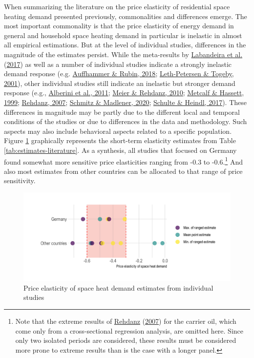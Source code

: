 \documentclass[12pt,twoside]{reedthesis}
\begin{document}
When summarizing the literature on the price elasticity of residential space heating demand presented previously, commonalities and differences emerge. The most important commonality is that the price elasticity of energy demand in general and household space heating demand in particular is inelastic in almost all empirical estimations. But at the level of individual studies, differences in the magnitude of the estimates persist. While the meta-results by \protect\hyperlink{ref-labandeira_etal17}{Labandeira et al.} (\protect\hyperlink{ref-labandeira_etal17}{2017}) as well as a number of individual studies indicate a strongly inelastic demand response (e.g. \protect\hyperlink{ref-auffhammer_rubin18}{Auffhammer \& Rubin, 2018}; \protect\hyperlink{ref-leth-petersen_togeby01}{Leth-Petersen \& Togeby, 2001}), other individual studies still indicate an inelastic but stronger demand response (e.g., \protect\hyperlink{ref-alberini_etal11}{Alberini et al., 2011}; \protect\hyperlink{ref-meier_rehdanz10}{Meier \& Rehdanz, 2010}; \protect\hyperlink{ref-metcalf_hassett99}{Metcalf \& Hassett, 1999}; \protect\hyperlink{ref-rehdanz07}{Rehdanz, 2007}; \protect\hyperlink{ref-schmitz_madlener20}{Schmitz \& Madlener, 2020}; \protect\hyperlink{ref-schulte_heindl17}{Schulte \& Heindl, 2017}). These differences in magnitude may be partly due to the different local and temporal conditions of the studies or due to differences in the data and methodology. Such aspects may also include behavioral aspects related to a specific population. Figure \ref{fig:literature-estimates-plot} graphically represents the short-term elasticity estimates from Table \ref{tab:estimates-literature}. As a synthesis, all studies that focused on Germany found somewhat more sensitive price elasticities ranging from -0.3 to -0.6.\footnote{Note that the extreme results of \protect\hyperlink{ref-rehdanz07}{Rehdanz} (\protect\hyperlink{ref-rehdanz07}{2007}) for the carrier oil, which come only from a cross-sectional regression analysis, are omitted here. Since only two isolated periods are considered, these results must be considered more prone to extreme results than is the case with a longer panel.} And also most estimates from other countries can be allocated to that range of price sensitivity.
\begin{figure}

{\centering \includegraphics[width=1\linewidth]{figure/plot_literature_estimates} 

}

\caption{Price elasticity of space heat demand estimates from individual studies}\label{fig:literature-estimates-plot}
\end{figure}
\end{document}
